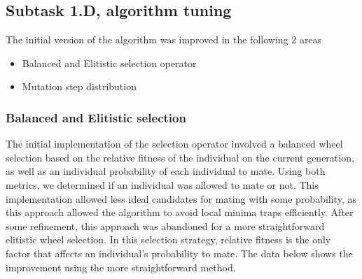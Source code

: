 \documentclass[openany]{article}
\begin{document}
				
				
				
				
				
		\subsection{Subtask 1.D, algorithm tuning}
			\label{tuning}
			The initial version of the algorithm was improved in the following 2 areas
			\begin{itemize}
				\item Balanced and Elitistic selection operator
				\item Mutation step distribution
			\end{itemize}
			\subsubsection{Balanced and Elitistic selection}
				The initial implementation of the selection operator involved a balanced wheel selection based on the relative fitness of the individual on the current generation, as well as
				an individual probability of each individual to mate. Using both metrics, we determined if an individual was allowed to mate or not. This implementation allowed less ideal
				candidates for mating with some probability, as this approach allowed the algorithm to avoid local minima traps efficiently. After some refinement, this approach was abandoned for a 
				more straightforward elitistic wheel selection. In this selection strategy, relative fitness is the only factor that affects an individual's probability to mate. The data below shows the 
				improvement using the more straightforward method.
\end{document}
